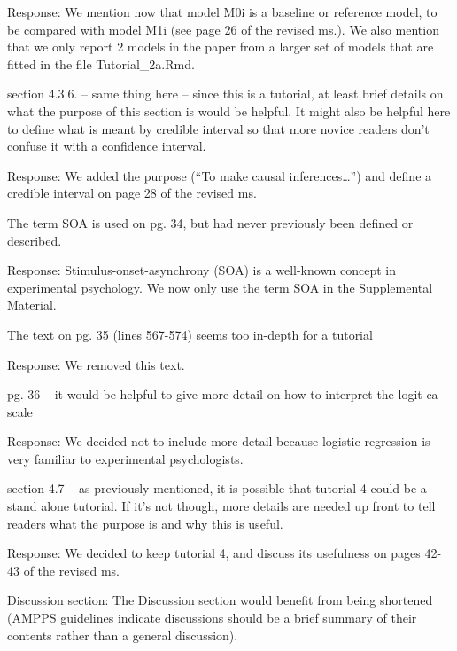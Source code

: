 \documentclass[
]{article}
\renewenvironment{quote}{\begin{leftbar}}{\end{leftbar}}
\begin{document}
Response: We mention now that model M0i is a baseline or reference
model, to be compared with model M1i (see page 26 of the revised ms.).
We also mention that we only report 2 models in the paper from a larger
set of models that are fitted in the file Tutorial\_2a.Rmd.

\begin{quote}
section 4.3.6. -- same thing here -- since this is a tutorial, at least
brief details on what the purpose of this section is would be helpful.
It might also be helpful here to define what is meant by credible
interval so that more novice readers don't confuse it with a confidence
interval.
\end{quote}

Response: We added the purpose (``To make causal inferences\ldots{}'')
and define a credible interval on page 28 of the revised ms.

\begin{quote}
The term SOA is used on pg. 34, but had never previously been defined or
described.
\end{quote}

Response: Stimulus-onset-asynchrony (SOA) is a well-known concept in
experimental psychology. We now only use the term SOA in the
Supplemental Material.

\begin{quote}
The text on pg. 35 (lines 567-574) seems too in-depth for a tutorial
\end{quote}

Response: We removed this text.

\begin{quote}
pg. 36 -- it would be helpful to give more detail on how to interpret
the logit-ca scale
\end{quote}

Response: We decided not to include more detail because logistic
regression is very familiar to experimental psychologists.

\begin{quote}
section 4.7 -- as previously mentioned, it is possible that tutorial 4
could be a stand alone tutorial. If it's not though, more details are
needed up front to tell readers what the purpose is and why this is
useful.
\end{quote}

Response: We decided to keep tutorial 4, and discuss its usefulness on
pages 42-43 of the revised ms.

\begin{quote}
Discussion section: The Discussion section would benefit from being
shortened (AMPPS guidelines indicate discussions should be a brief
summary of their contents rather than a general discussion).
\end{quote}
\end{document}
